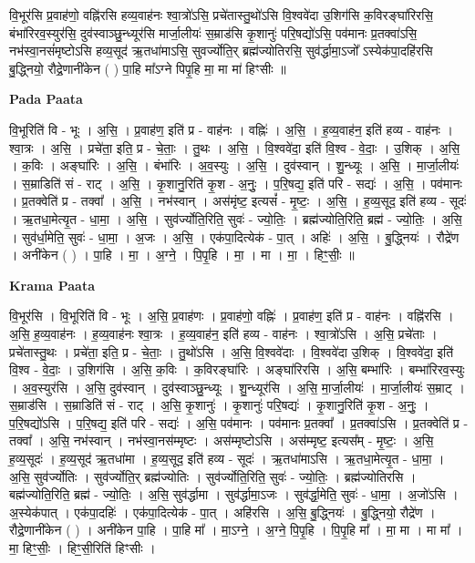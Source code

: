 \documentclass[17pt]{extarticle}
\begin{document}
वि॒भूर॑सि प्र॒वाह॑णो॒ वह्नि॑रसि हव्य॒वाह॑नः श्वा॒त्रो॑ऽसि॒ प्रचे॑तास्तु॒थो॑ऽसि वि॒श्ववे॑दा उ॒शिग॑सि क॒विरङ्घा॑रिरसि॒ बंभा॑रिरव॒स्युर॑सि॒ दुव॑स्वाञ्छु॒न्ध्यूर॑सि मार्जा॒लीयः॑ स॒म्राड॑सि कृ॒शानुः॑ परि॒षद्यो॑ऽसि॒ पव॑मानः प्र॒तक्वा॑ऽसि॒ नभ॑स्वा॒नसं॑मृष्टोऽसि हव्य॒सूद॑ ऋ॒तधा॑माऽसि॒ सुवर्ज्योति॒र् ब्रह्म॑ज्योतिरसि॒ सुव॑र्द्धामा॒ऽजो᳚ ऽस्येक॑पा॒दहि॑रसि बु॒द्ध्नियो॒ रौद्रे॒णानी॑केन ( ) पा॒हि मा᳚ऽग्ने पिपृ॒हि मा॒ मा मा॑ हिꣳसीः ॥ \newline

\textbf{Pada Paata} \newline

वि॒भूरिति॑ वि - भूः । अ॒सि॒ । प्र॒वाह॑ण॒ इति॑ प्र - वाह॑नः । वह्निः॑ । अ॒सि॒ । ह॒व्य॒वाह॑न॒ इति॑ हव्य - वाह॑नः । श्वा॒त्रः । अ॒सि॒ । प्रचे॑ता॒ इति॒ प्र - चे॒ताः॒ । तु॒थः । अ॒सि॒ । वि॒श्ववे॑दा॒ इति॑ वि॒श्व - वे॒दाः॒ । उ॒शिक् । अ॒सि॒ । क॒विः । अङ्घा॑रिः । अ॒सि॒ । बंभा॑रिः । अ॒व॒स्युः । अ॒सि॒ । दुव॑स्वान् । शु॒न्ध्यूः । अ॒सि॒ । मा॒र्जा॒लीयः॑ । स॒म्राडिति॑ सं - राट् । अ॒सि॒ । कृ॒शानु॒रिति॑ कृ॒श - अ॒नुः॒ । प॒रि॒षद्य॒ इति॑ परि - सद्यः॑ । अ॒सि॒ । पव॑मानः । प्र॒तक्वेति॑ प्र - तक्वा᳚ । अ॒सि॒ । नभ॑स्वान् । अस॑मृंष्ट॒ इत्यसं᳚ - मृ॒ष्टः॒ । अ॒सि॒ । ह॒व्य॒सूद॒ इति॑ हव्य - सूदः॑ । ऋ॒तधा॒मेत्यृ॒त - धा॒मा॒ । अ॒सि॒ । सुव॑र्ज्योति॒रिति॒ सुवः॑ - ज्यो॒तिः॒ । ब्रह्म॑ज्योति॒रिति॒ ब्रह्म॑ - ज्यो॒तिः॒ । अ॒सि॒ । सुव॑र्धा॒मेति॒ सुवः॑ - धा॒मा॒ । अ॒जः । अ॒सि॒ । एक॑पा॒दित्येक॑ - पा॒त् । अहिः॑ । अ॒सि॒ । बु॒द्ध्नियः॑ । रौद्रे॑ण । अनी॑केन ( ) । पा॒हि । मा॒ । अ॒ग्ने॒ । पि॒पृ॒हि । मा॒ । मा । मा॒ । हिꣳ॒॒सीः॒ ॥  \newline


\textbf{Krama Paata} \newline

वि॒भूर॑सि । वि॒भूरिति॑ वि - भूः । अ॒सि॒ प्र॒वाह॑णः । प्र॒वाह॑णो॒ वह्निः॑ । प्र॒वाह॑ण॒ इति॑ प्र - वाह॑नः । वह्नि॑रसि । अ॒सि॒ ह॒व्य॒वाह॑नः । ह॒व्य॒वाह॑नः श्वा॒त्रः । ह॒व्य॒वाह॑न॒ इति॑ हव्य - वाह॑नः । श्वा॒त्रो॑ऽसि । अ॒सि॒ प्रचे॑ताः । प्रचे॑तास्तु॒थः । प्रचे॑ता॒ इति॒ प्र - चे॒ताः॒ । तु॒थो॑ऽसि । अ॒सि॒ वि॒श्ववे॑दाः । वि॒श्ववे॑दा उ॒शिक् । वि॒श्ववे॑दा॒ इति॑ वि॒श्व - वे॒दाः॒ । उ॒शिग॑सि । अ॒सि॒ क॒विः । क॒विरङ्घा॑रिः । अङ्घा॑रिरसि । अ॒सि॒ बम्भा॑रिः । बम्भा॑रिरव॒स्युः । अ॒व॒स्युर॑सि । अ॒सि॒ दुव॑स्वान् । दुव॑स्वाञ्छु॒न्ध्यूः । शु॒न्ध्यूर॑सि । अ॒सि॒ मा॒र्जा॒लीयः॑ । मा॒र्जा॒लीयः॑ स॒म्राट् । स॒म्राड॑सि । स॒म्राडिति॑ सं - राट् । अ॒सि॒ कृ॒शानुः॑ । कृ॒शानुः॑ परि॒षद्यः॑ । कृ॒शानु॒रिति॑ कृ॒श - अ॒नुः॒ । प॒रि॒षद्यो॑ऽसि । प॒रि॒षद्य॒ इति॑ परि - सद्यः॑ । अ॒सि॒ पव॑मानः । पव॑मानः प्र॒तक्वा᳚ । प्र॒तक्वा॑ऽसि । प्र॒तक्वेति॑ प्र - तक्वा᳚ । अ॒सि॒ नभ॑स्वान् । नभ॑स्वा॒नस॑म्मृष्टः । अस॑म्मृष्टोऽसि । अस॑म्मृष्ट॒ इत्यस᳚म् - मृ॒ष्टः॒ । अ॒सि॒ ह॒व्य॒सूदः॑ । ह॒व्य॒सूद॑ ऋ॒तधा॑मा । ह॒व्य॒सूद॒ इति॑ हव्य - सूदः॑ । ऋ॒तधा॑माऽसि । ऋ॒तधा॒मेत्यृ॒त - धा॒मा॒ । अ॒सि॒ सुव॑र्ज्योतिः । सुव॑र्ज्योति॒र् ब्रह्म॑ज्योतिः । सुव॑र्ज्योति॒रिति॒ सुवः॑ - ज्यो॒तिः॒ । ब्रह्म॑ज्योतिरसि । बह्म॑ज्योति॒रिति॒ ब्रह्म॑ - ज्यो॒तिः॒ । अ॒सि॒ सुव॑र्द्धामा । सुव॑र्द्धामा॒ऽजः । सुव॑र्द्धा॒मेति॒ सुवः॑ - धा॒मा॒ । अ॒जो॑ऽसि । अ॒स्येक॑पात् । एक॑पा॒दहिः॑ । एक॑पा॒दित्येक॑ - पा॒त् । अहि॑रसि । अ॒सि॒ बु॒द्ध्नियः॑ । बु॒द्ध्नियो॒ रौद्रे॑ण । रौद्रे॒णानी॑केन ( ) । अनी॑केन पा॒हि । पा॒हि मा᳚ । मा॒ऽग्ने॒ । अ॒ग्ने॒ पि॒पृ॒हि । पि॒पृ॒हि मा᳚ । मा॒ मा । मा मा᳚ । मा॒ हिꣳ॒॒सीः॒ । हिꣳ॒॒सी॒रिति॑ हिꣳसीः । \newline
\end{document}
